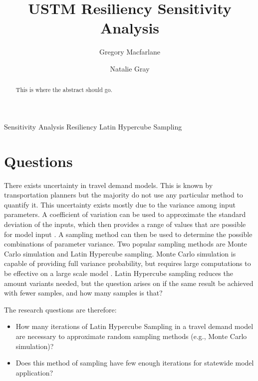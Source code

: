 \documentclass[3p, authoryear, review]{elsarticle} %
\providecommand{\tightlist}{%
  \setlength{\itemsep}{0pt}\setlength{\parskip}{0pt}}
\begin{document}
\begin{frontmatter}

  \title{USTM Resiliency Sensitivity Analysis}
    \author[Brigham Young University]{Gregory Macfarlane}
    \author[Brigham Young University]{Natalie Gray}
      \address[Brigham Young University]{Civil and Environmental Engineering Department, 430 Engineering Building, Provo, Utah 84602}
  
  \begin{abstract}
  This is where the abstract should go.
  \end{abstract}
   \begin{keyword} Sensitivity Analysis Resiliency Latin Hypercube Sampling\end{keyword}
 \end{frontmatter}

\hypertarget{questions}{%
\section{Questions}\label{questions}}

There exists uncertainty in travel demand models. This is known by transportation planners but the majority do not use any particular method to quantify it. This uncertainty exists mostly due to the variance among input parameters. A coefficient of variation can be used to approximate the standard deviation of the inputs, which then provides a range of values that are possible for model input \citep{zhao2002propagation}. A sampling method can then be used to determine the possible combinations of parameter variance. Two popular sampling methods are Monte Carlo simulation and Latin Hypercube sampling. Monte Carlo simulation is capable of providing full variance probability, but requires large computations to be effective on a large scale model \citep{yang2013sensitivity}. Latin Hypercube sampling reduces the amount variants needed, but the question arises on if the same result be achieved with fewer samples, and how many samples is that?

The research questions are therefore:

\begin{itemize}
\tightlist
\item
  How many iterations of Latin Hypercube Sampling in a travel demand model are necessary to approximate random sampling methods (e.g., Monte Carlo simulation)?
\item
  Does this method of sampling have few enough iterations for statewide model application?
\end{itemize}
\end{document}
